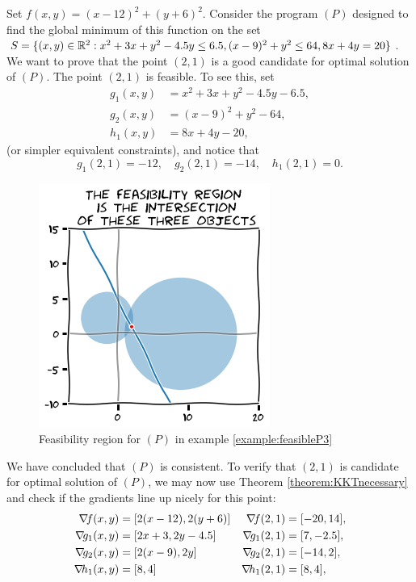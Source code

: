 \begin{example}\label{example:feasibleP3}
Set $f(x,y)=(x-12)^2+(y+6)^2$.  Consider the program $(P)$ designed to find the global minimum of this function on the set $S=\{ (x,y) \in \mathbb{R}^2 : x^2+3x+y^2-4.5y \leq 6.5, (x-9)^2 +y^2 \leq 64, 8x+4y=20 \}$.  We want to prove that the point $(2,1)$ is a good candidate for optimal solution of $(P)$.
The point $(2,1)$ is feasible.  To see this, set 
\begin{align*}
g_1(x,y) &=x^2+3x+y^2-4.5y-6.5, \\
g_2(x,y) &=(x-9)^2+y^2-64, \\
h_1(x,y) &=8x+4y-20,
\end{align*}
(or simpler equivalent constraints), and notice that
\begin{equation*}
g_1(2,1)=-12, \quad g_2(2,1)=-14, \quad h_1(2,1)=0.
\end{equation*}
\begin{figure}[ht!]
\includegraphics[width=0.5\linewidth]{images/feasibleP3.png}
\caption{Feasibility region for $(P)$ in example \ref{example:feasibleP3}}
\label{figure:feasibleP3}
\end{figure}
We have concluded that $(P)$ is consistent.  To verify that $(2,1)$ is candidate for optimal solution of $(P)$, we may now use Theorem \ref{theorem:KKTnecessary} and check if the gradients line up nicely for this point:
\begin{align*}
\gradient{f}(x,y)   &= [ 2(x-12), 2(y+6) ] &\gradient{f}(2,1)   &= [-20, 14], \\
\gradient{g_1}(x,y) &= [ 2x+3, 2y-4.5 ]    &\gradient{g_1}(2,1) &= [  7, -2.5], \\
\gradient{g_2}(x,y) &= [ 2(x-9), 2y ]      &\gradient{g_2}(2,1) &= [-14, 2], \\
\gradient{h_1}(x,y) &= [ 8, 4]             &\gradient{h_1}(2,1) &= [  8, 4], 

\end{align*}
\end{example}
